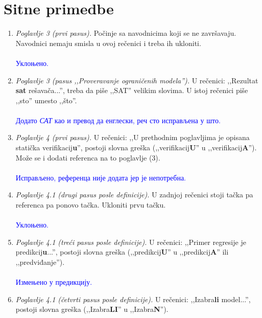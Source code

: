 \documentclass[a4paper]{report}
\newcommand{\odgovor}[1]{\textcolor{blue}{#1}}
\begin{document}
\section{Sitne primedbe}
\begin{enumerate}
	\item \textit{Poglavlje 3 (prvi pasus).} Počinje sa navodnicima koji se ne završavaju. Navodnici nemaju smisla u ovoj rečenici i treba ih ukloniti.
    \\\\
    \odgovor{Уклоњено.} 
	\\
    \item \textit{Poglavlje 3 (pasus ,,Proveravanje ograničenih modela'').} U rečenici: ,,Rezultat \textbf{sat} rešavača...'', treba da piše ,,SAT'' velikim slovima. U istoj rečenici piše ,,sto'' umesto ,,što''.
    \\\\
    \odgovor{Додато \emph{САТ} као и превод да енглески, реч сто исправљена у што.} 
	\\
	\item \textit{Poglavlje 4 (prvi pasus).} U rečenici: ,,U prethodnim poglavljima je opisana statička verifikacij\textbf{u}'', postoji slovna greška (,,verifikacij\textbf{U}'' u ,,verifikacij\textbf{A}''). Može se i dodati referenca na to poglavlje (3).
    \\\\
    \odgovor{Исправљено, референца није додата јер је непотребна.} 
	\\
	\item \textit{Poglavlje 4.1 (drugi pasus posle definicije).} U zadnjoj rečenici stoji tačka pa referenca pa ponovo tačka. Ukloniti prvu tačku.
    \\\\
    \odgovor{Уклоњено.} 
	\\
	\item \textit{Poglavlje 4.1 (treći pasus posle definicije).} U rečenici: ,,Primer regresije je predikcij\textbf{u}...'', postoji slovna greška (,,predikcij\textbf{U}'' u ,,predikcij\textbf{A}'' ili ,,predviđanje'').
    \\\\
    \odgovor{Измењено у предикцију.} 
	\\
	\item \textit{Poglavlje 4.1 (četvrti pasus posle definicije).} U rečenici: ,,Izabra\textbf{li} model...'', postoji slovna greška (,,Izabra\textbf{LI}'' u ,,Izabra\textbf{N}'').

\end{enumerate}
\end{document}
